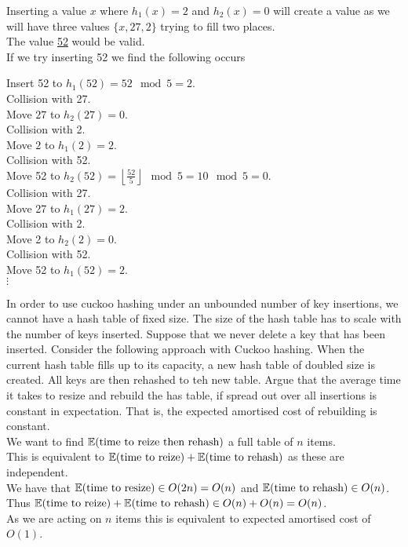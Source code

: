 \documentclass[11pt,a4paper]{article}
\begin{document}
\apart
Inserting a value $x$ where $h_1(x)=2$ and $h_2(x)=0$ will create a value as we will have three values $\{x,27,2\}$ trying to fill two places.\\
The value \underline{52} would be valid.\\
If we try inserting 52 we find the following occurs
\begin{adjustwidth}{1cm}{}
	Insert 52 to $h_1(52)=52\mod5=2$.\\
	Collision with 27.\\
	Move $27$ to $h_2(27)=0$.\\
	Collision with 2.\\
	Move $2$ to $h_1(2)=2$.\\
	Collision with 52.\\
	Move 52 to $h_2(52)=\left\lfloor\frac{52}{5}\right\rfloor\mod5=10\mod5=0$.\\
	Collision with 27.\\
	Move 27 to $h_1(27)=2$.\\
	Collision with 2.\\
	Move 2 to $h_2(2)=0$.\\
	Collision with 52.\\
	Move 52 to $h_1(52)=2$.\\
	$\vdots$
\end{adjustwidth}

\question
In order to use cuckoo hashing under an unbounded number of key insertions, we cannot have a hash table of fixed size. The size of the hash table has to scale with the number of keys inserted. Suppose that we never delete a key that has been inserted. Consider the following approach with Cuckoo hashing. When the current hash table fills up to its capacity, a new hash table of doubled size is created. All keys are then rehashed to teh new table. Argue that the average time it takes to resize and rebuild the has table, if spread out over all insertions is constant in expectation. That is, the expected amortised cost of rebuilding is constant.\\

\ans
We want to find $\mathbb{E}(\text{time to reize then rehash})$ a full table of $n$ items.\\
This is equivalent to $\mathbb{E}(\text{time to reize})+\mathbb{E}(\text{time to rehash})$ as these are independent.\\
We have that $\mathbb{E}(\text{time to resize})\in O(2n)=O(n)$ and $\mathbb{E}(\text{time to rehash})\in O(n)$.\\
Thus $\mathbb{E}(\text{time to reize})+\mathbb{E}(\text{time to rehash})\in O(n)+O(n)=O(n)$.\\
As we are acting on $n$ items this is equivalent to expected amortised cost of $O(1)$.
\end{document}
